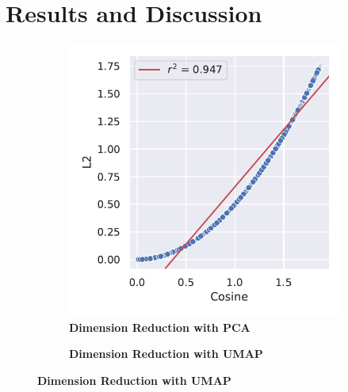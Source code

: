 \chapter{Results and Discussion} \label{chap:Results_and_Discussion}

\begin{figure}
    \centering
    \begin{subfigure}[b]{0.475\textwidth}
        \caption[Dimension Reduction with \Acrshort{PCA}]{\textbf{Dimension Reduction with \Acrshort{PCA}}}
        \label{subfig:Normalisation_PCA}            \includegraphics[width=\textwidth]{PCA/Difference_Distance_Calculation.pdf}
    \end{subfigure}
    \hfill
    \begin{subfigure}[b]{0.475\textwidth}
        \caption[Dimension Reduction with \Acrshort{UMAP}]{\textbf{Dimension Reduction with \Acrshort{UMAP}}}

\end{subfigure}
\end{figure}
